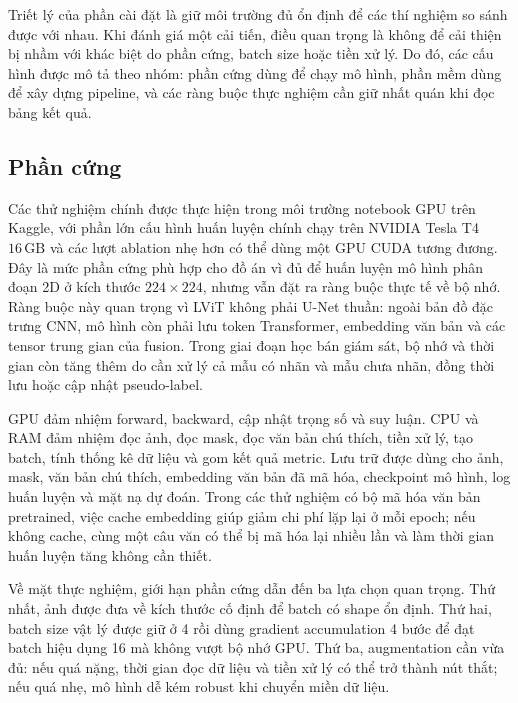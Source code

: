 Triết lý của phần cài đặt là giữ môi trường đủ ổn định để các thí nghiệm so sánh được với nhau. Khi đánh giá một cải tiến, điều quan trọng là không để cải thiện bị nhầm với khác biệt do phần cứng, batch size hoặc tiền xử lý. Do đó, các cấu hình được mô tả theo nhóm: phần cứng dùng để chạy mô hình, phần mềm dùng để xây dựng pipeline, và các ràng buộc thực nghiệm cần giữ nhất quán khi đọc bảng kết quả.

\subsection{Phần cứng}

Các thử nghiệm chính được thực hiện trong môi trường notebook GPU trên Kaggle, với phần lớn cấu hình huấn luyện chính chạy trên NVIDIA Tesla T4 \(16\,\mathrm{GB}\) và các lượt ablation nhẹ hơn có thể dùng một GPU CUDA tương đương. Đây là mức phần cứng phù hợp cho đồ án vì đủ để huấn luyện mô hình phân đoạn 2D ở kích thước \(224\times224\), nhưng vẫn đặt ra ràng buộc thực tế về bộ nhớ. Ràng buộc này quan trọng vì LViT không phải U-Net thuần: ngoài bản đồ đặc trưng CNN, mô hình còn phải lưu token Transformer, embedding văn bản và các tensor trung gian của fusion. Trong giai đoạn học bán giám sát, bộ nhớ và thời gian còn tăng thêm do cần xử lý cả mẫu có nhãn và mẫu chưa nhãn, đồng thời lưu hoặc cập nhật pseudo-label.

GPU đảm nhiệm forward, backward, cập nhật trọng số và suy luận. CPU và RAM đảm nhiệm đọc ảnh, đọc mask, đọc văn bản chú thích, tiền xử lý, tạo batch, tính thống kê dữ liệu và gom kết quả metric. Lưu trữ được dùng cho ảnh, mask, văn bản chú thích, embedding văn bản đã mã hóa, checkpoint mô hình, log huấn luyện và mặt nạ dự đoán. Trong các thử nghiệm có bộ mã hóa văn bản pretrained, việc cache embedding giúp giảm chi phí lặp lại ở mỗi epoch; nếu không cache, cùng một câu văn có thể bị mã hóa lại nhiều lần và làm thời gian huấn luyện tăng không cần thiết.

Về mặt thực nghiệm, giới hạn phần cứng dẫn đến ba lựa chọn quan trọng. Thứ nhất, ảnh được đưa về kích thước cố định để batch có shape ổn định. Thứ hai, batch size vật lý được giữ ở 4 rồi dùng gradient accumulation 4 bước để đạt batch hiệu dụng 16 mà không vượt bộ nhớ GPU. Thứ ba, augmentation cần vừa đủ: nếu quá nặng, thời gian đọc dữ liệu và tiền xử lý có thể trở thành nút thắt; nếu quá nhẹ, mô hình dễ kém robust khi chuyển miền dữ liệu.

